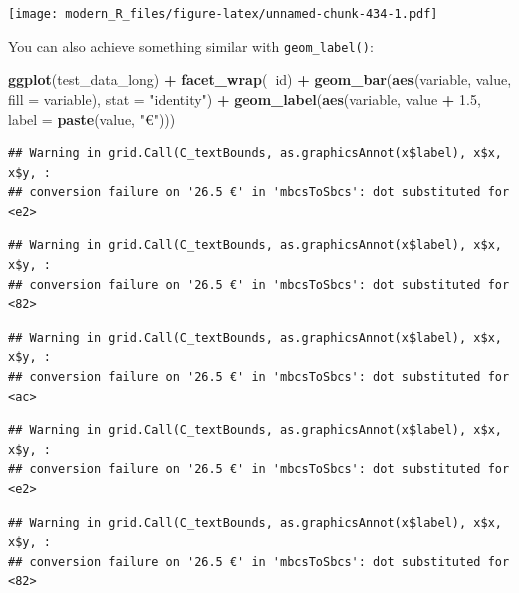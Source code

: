 \documentclass[]{gitbook}
\newenvironment{Shaded}{\begin{snugshade}}{\end{snugshade}}
\newcommand{\DataTypeTok}[1]{\textcolor[rgb]{0.13,0.29,0.53}{#1}}
\newcommand{\FloatTok}[1]{\textcolor[rgb]{0.00,0.00,0.81}{#1}}
\newcommand{\KeywordTok}[1]{\textcolor[rgb]{0.13,0.29,0.53}{\textbf{#1}}}
\newcommand{\NormalTok}[1]{#1}
\newcommand{\OperatorTok}[1]{\textcolor[rgb]{0.81,0.36,0.00}{\textbf{#1}}}
\newcommand{\StringTok}[1]{\textcolor[rgb]{0.31,0.60,0.02}{#1}}
\begin{document}
\texttt{[image: modern\_R\_files/figure-latex/unnamed-chunk-434-1.pdf]}

You can also achieve something similar with \texttt{geom\_label()}:

\begin{Shaded}
\begin{Highlighting}[]
\KeywordTok{ggplot}\NormalTok{(test_data_long) }\OperatorTok{+}
\StringTok{  }\KeywordTok{facet_wrap}\NormalTok{(}\OperatorTok{~}\NormalTok{id) }\OperatorTok{+}
\StringTok{  }\KeywordTok{geom_bar}\NormalTok{(}\KeywordTok{aes}\NormalTok{(variable, value, }\DataTypeTok{fill =}\NormalTok{ variable), }\DataTypeTok{stat =} \StringTok{"identity"}\NormalTok{) }\OperatorTok{+}
\StringTok{  }\KeywordTok{geom_label}\NormalTok{(}\KeywordTok{aes}\NormalTok{(variable, value }\OperatorTok{+}\StringTok{ }\FloatTok{1.5}\NormalTok{, }\DataTypeTok{label =} \KeywordTok{paste}\NormalTok{(value, }\StringTok{"€"}\NormalTok{)))}
\end{Highlighting}
\end{Shaded}

\begin{verbatim}
## Warning in grid.Call(C_textBounds, as.graphicsAnnot(x$label), x$x, x$y, :
## conversion failure on '26.5 €' in 'mbcsToSbcs': dot substituted for <e2>
\end{verbatim}

\begin{verbatim}
## Warning in grid.Call(C_textBounds, as.graphicsAnnot(x$label), x$x, x$y, :
## conversion failure on '26.5 €' in 'mbcsToSbcs': dot substituted for <82>
\end{verbatim}

\begin{verbatim}
## Warning in grid.Call(C_textBounds, as.graphicsAnnot(x$label), x$x, x$y, :
## conversion failure on '26.5 €' in 'mbcsToSbcs': dot substituted for <ac>
\end{verbatim}

\begin{verbatim}
## Warning in grid.Call(C_textBounds, as.graphicsAnnot(x$label), x$x, x$y, :
## conversion failure on '26.5 €' in 'mbcsToSbcs': dot substituted for <e2>
\end{verbatim}

\begin{verbatim}
## Warning in grid.Call(C_textBounds, as.graphicsAnnot(x$label), x$x, x$y, :
## conversion failure on '26.5 €' in 'mbcsToSbcs': dot substituted for <82>
\end{verbatim}
\end{document}
